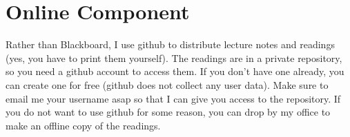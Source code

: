 \section{Online Component}
Rather than Blackboard, I use github to distribute lecture notes and readings (yes, you have to print them yourself).
The readings are in a private repository, so you need a github account to access them.
If you don't have one already, you can create one for free (github does not collect any user data).
Make sure to email me your username asap so that I can give you access to the repository.
If you do not want to use github for some reason, you can drop by my office to make an offline copy of the readings.

